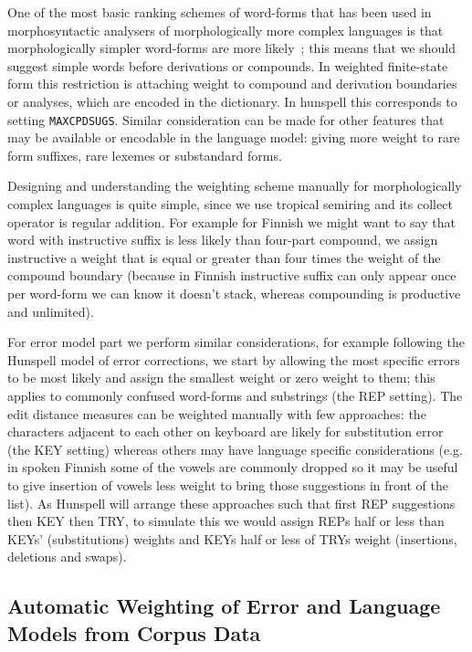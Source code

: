 \documentclass[a4paper,12pt]{article}
\begin{document}
One of the most basic ranking schemes of word-forms that has been used in
morphosyntactic analysers of morphologically more complex languages is that
morphologically simpler word-forms are more
likely~\cite[]{karlsson1992swetwol}; this means that we should suggest simple
words before derivations or compounds.  In weighted finite-state form this
restriction is attaching weight to compound and derivation boundaries or
analyses, which are encoded in the dictionary. In hunspell this corresponds to
setting \texttt{MAXCPDSUGS}. Similar consideration can be made for other
features that may be available or encodable in the language model: giving more
weight to rare form suffixes, rare lexemes or substandard forms.

Designing and understanding the weighting scheme manually for morphologically
complex languages is quite simple, since we use tropical semiring and its
collect operator is regular addition. For example for Finnish we might want to
say that word with instructive suffix is less likely than four-part compound,
we assign instructive a weight that is equal or greater than four times the
weight of the compound boundary (because in Finnish instructive suffix can only
appear once per word-form we can know it doesn't stack, whereas compounding is
productive and unlimited).

For error model part we perform similar considerations, for example following
the Hunspell model of error corrections, we start by allowing the most
specific errors to be most likely and assign the smallest weight or zero weight
to them; this applies to commonly confused word-forms and substrings (the REP
setting). The edit distance measures can be weighted manually with few
approaches: the characters adjacent to each other on keyboard are likely
for substitution error (the KEY setting) whereas others may have language
specific considerations (e.g. in spoken Finnish some of the vowels are commonly
dropped so it may be useful to give insertion of vowels less weight to bring
those suggestions in front of the list). As Hunspell will arrange these
approaches such that first REP suggestions then KEY then TRY, to simulate this
we would assign REPs half or less than KEYs' (substitutions) weights and
KEYs half or less of TRYs weight (insertions, deletions and swaps).

\subsection{Automatic Weighting of Error and Language Models from Corpus Data}
\label{subsec:automatic-weighting}
\end{document}
